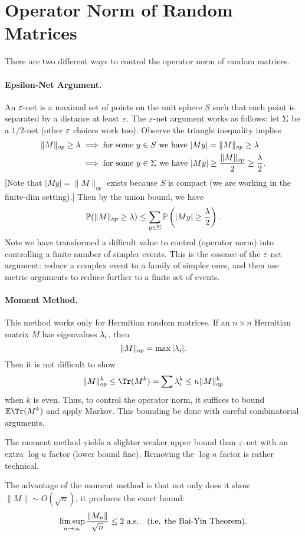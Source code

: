 \section*{Operator Norm of Random Matrices}

There are two different ways to control the operator norm of random matrices.

\paragraph{Epsilon-Net Argument.} An $\e$-net is a maximal set of points on the unit sphere $S$ such that each point is separated by a distance at least $\e$. The $\e$-net argument works as follows: let $\S$ be a $1/2$-net (other $\e$ choices work too). Observe the triangle inequality implies
\[
    \begin{split}
        \|M\|_{op} \ge \l & \implies \text{for some $y \in S$ we have } |My| = \|M\|_{op} \ge \l                       \\
                          & \implies \text{for some $y \in \S$ we have } |My| \ge \frac{\|M\|_{op}}{2} \ge \frac{\l}{2}. \\
    \end{split}
\]
[Note that $|My| = \|M\|_{op}$ exists because $S$ is compact (we are working in the finite-dim setting).] Then by the union bound, we have
\[
    \bP(\|M\|_{op} \ge \l) \le \sum_{y \in \S} \bP\left(|My| \ge \frac{\l}{2}\right).
\]
Note we have transformed a difficult value to control (operator norm) into controlling a finite number of simpler events. This is the essence of the $\e$-net argument: reduce a complex event to a family of simpler ones, and then use metric arguments to reduce further to a finite set of events.

\paragraph{Moment Method.} This method works only for Hermitian random matrices. If an $n \times n$ Hermitian matrix $M$ has eigenvalues $\l_i$, then
\[
    \|M\|_{op} = \max |\l_i|.
\]
Then it is not difficult to show
\[
    \|M\|^k_{op} \leq \Tr(M^k) = \sum \l_i^k \leq n\|M\|^k_{op}
\]
when $k$ is even. Thus, to control the operator norm, it suffices to bound $\bE \Tr(M^k)$ and apply Markov. This bounding be done with careful combinatorial arguments.

The moment method yields a slighter weaker upper bound than $\e$-net with an extra $\log n$ factor (lower bound fine). Removing the $\log n$ factor is rather technical.

The advantage of the moment method is that not only does it show $\|M\| \sim O(\sqrt{n})$, it produces the exact bound:
\[
    \limsup_{n \to \i} \frac{\|M_n\|}{\sqrt{n}} \le 2 \ \text{a.s.} \quad (\text{i.e. the Bai-Yin Theorem}).
\]

